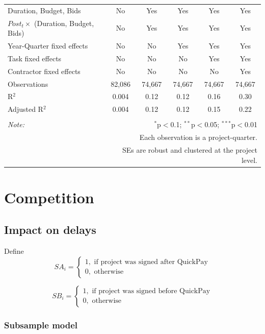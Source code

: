 \documentclass[
]{article}
\begin{document}
\begin{table}[H]
\begin{tabular}{@{\extracolsep{-2pt}}lccccc}
Duration, Budget, Bids & No & Yes & Yes & Yes & Yes \\ 
$Post_t \times $  (Duration, Budget, Bids) & No & Yes & Yes & Yes & Yes \\ 
Year-Quarter fixed effects & No & No & Yes & Yes & Yes \\ 
Task fixed effects & No & No & No & Yes & Yes \\ 
Contractor fixed effects & No & No & No & No & Yes \\ 
Observations & 82,086 & 74,667 & 74,667 & 74,667 & 74,667 \\ 
R$^{2}$ & 0.004 & 0.12 & 0.12 & 0.16 & 0.30 \\ 
Adjusted R$^{2}$ & 0.004 & 0.12 & 0.12 & 0.15 & 0.22 \\ 
\hline 
\hline \\[-1.8ex] 
\textit{Note:}  & \multicolumn{5}{r}{$^{*}$p$<$0.1; $^{**}$p$<$0.05; $^{***}$p$<$0.01} \\ 
 & \multicolumn{5}{r}{Each observation is a project-quarter.} \\ 
 & \multicolumn{5}{r}{SEs are robust and clustered at the project level.} \\ 
\end{tabular} 
\end{table}

\hypertarget{competition}{%
\section{Competition}\label{competition}}

\hypertarget{impact-on-delays}{%
\subsection{Impact on delays}\label{impact-on-delays}}

Define
\[ SA_i = \begin{cases} 1, \text{ if project was signed after QuickPay}\\
0, \text{ otherwise} \end{cases}\]

\[ SB_i = \begin{cases} 1, \text{ if project was signed before QuickPay}\\
0, \text{ otherwise} \end{cases}\]

\hypertarget{subsample-model}{%
\subsubsection{Subsample model}\label{subsample-model}}
\end{document}
